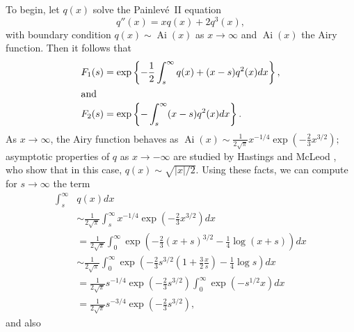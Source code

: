 \documentclass[final]{IEEEtran}
\newcommand{\half}{\frac{1}{2}}
\DeclareMathOperator*{\Ai}{Ai}
\begin{document}
To begin, let $q(x)$ solve the Painlev\'e~II equation
\[
    q''(x) = x q(x) + 2 q^3(x),
\]
with boundary condition $q(x) \sim \Ai(x)$ as $x \to \infty$ and $\Ai(x)$ the Airy function. Then it follows that
\begin{align*}
    F_1(s)
        &= \exp \left\{
            -\half \int_s^\infty q(x) + (x - s) q^2(x) dx
        \right\}, \\
\intertext{and}
    F_2(s)
        &= \exp \left\{
            - \int_s^\infty (x - s) q^2(x) dx
        \right\}.
\end{align*}
As $x \to \infty$, the Airy function behaves as
\(
    \Ai(x)
        \sim \frac{1}{2\sqrt{\pi}} x^{-1/4}
             \exp \left( -\frac{2}{3} x^{3/2} \right);
\)
asymptotic properties of $q$ as $x \to -\infty$ are studied by Hastings and McLeod \cite{hastings1980bvp}, who show that in this case,
\(
    q(x) \sim \sqrt{ |x| / 2 }.
\)
Using these facts, we can compute for $s \to \infty$ the term
\begin{align*}
    \int_s^\infty & q(x) dx \\
        & \sim \frac{1}{2 \sqrt{\pi}}
              \int_s^\infty
                   x^{-1/4} \exp\left( -\frac{2}{3} x^{3/2} \right) dx \\
        &= \frac{1}{2 \sqrt{\pi}}
           \int_0^\infty
               \exp\left(
                   -\frac{2}{3} (x + s)^{3/2} - \frac{1}{4} \log (x + s)
               \right) dx \\
        &\sim \frac{1}{2 \sqrt{\pi}}
              \int_0^\infty
                  \exp\left(
                      -\frac{2}{3} s^{3/2}
                      \left(
                          1 + \frac{3}{2} \frac{x}{s}
                      \right)
                      - \frac{1}{4} \log s
                  \right)
                  dx \\
        &= \frac{1}{2 \sqrt{\pi}} s^{-1/4}
           \exp\left( -\frac{2}{3} s^{3/2} \right)
           \int_0^\infty \exp\left( -s^{1/2} x \right) dx \\
        &= \frac{1}{2 \sqrt{\pi}} s^{-3/4}
           \exp\left( -\frac{2}{3} s^{3/2} \right) ,
\end{align*}
and also
\end{document}
